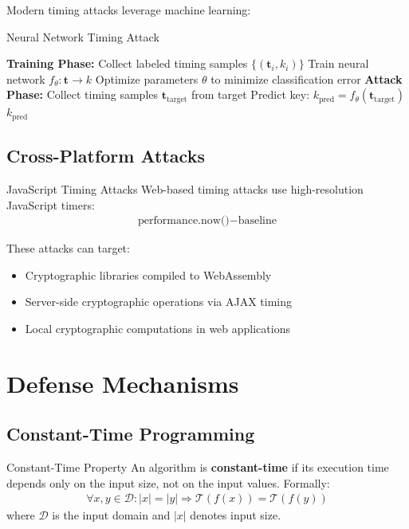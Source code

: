 \documentclass[12pt,a4paper]{article}
\theoremstyle{definition}
\newcommand{\time}[1]{\mathcal{T}\left(#1\right)}
\begin{document}
Modern timing attacks leverage machine learning:

\begin{algorithmbox}{Neural Network Timing Attack}
\begin{algorithmic}
\STATE \textbf{Training Phase:}
\STATE Collect labeled timing samples $\{(\mathbf{t}_i, k_i)\}$
\STATE Train neural network $f_{\theta}: \mathbf{t} \rightarrow k$
\STATE Optimize parameters $\theta$ to minimize classification error
\STATE \textbf{Attack Phase:}
\STATE Collect timing samples $\mathbf{t}_{\text{target}}$ from target
\STATE Predict key: $k_{\text{pred}} = f_{\theta}(\mathbf{t}_{\text{target}})$
\RETURN $k_{\text{pred}}$
\end{algorithmic}
\end{algorithmbox}

\subsection{Cross-Platform Attacks}

\begin{definitionbox}{JavaScript Timing Attacks}
Web-based timing attacks use high-resolution JavaScript timers:
\begin{align}
\text{performance.now()} - \text{baseline}
\end{align}

These attacks can target:
\begin{itemize}
    \item Cryptographic libraries compiled to WebAssembly
    \item Server-side cryptographic operations via AJAX timing
    \item Local cryptographic computations in web applications
\end{itemize}
\end{definitionbox}

\section{Defense Mechanisms}

\subsection{Constant-Time Programming}

\begin{definitionbox}{Constant-Time Property}
An algorithm is \textbf{constant-time} if its execution time depends only on the input size, not on the input values. Formally:
\begin{align}
\forall x, y \in \mathcal{D} : |x| = |y| \Rightarrow \time{f(x)} = \time{f(y)}
\end{align}
where $\mathcal{D}$ is the input domain and $|x|$ denotes input size.
\end{definitionbox}
\end{document}
